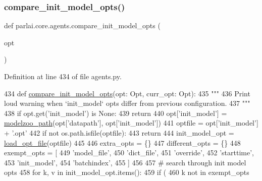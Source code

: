 \subsubsection{\texorpdfstring{compare\+\_\+init\+\_\+model\+\_\+opts()}{compare\_init\_model\_opts()}}
{\footnotesize\ttfamily def parlai.\+core.\+agents.\+compare\+\_\+init\+\_\+model\+\_\+opts (\begin{DoxyParamCaption}\item[{}]{opt }\end{DoxyParamCaption})}



Definition at line 434 of file agents.\+py.


\begin{DoxyCode}
434 \textcolor{keyword}{def }\hyperlink{namespaceparlai_1_1core_1_1agents_a9761bb2314603dd92f5eee786930b21a}{compare\_init\_model\_opts}(opt: Opt, curr\_opt: Opt):
435     \textcolor{stringliteral}{"""}
436 \textcolor{stringliteral}{    Print loud warning when `init\_model` opts differ from previous configuration.}
437 \textcolor{stringliteral}{    """}
438     \textcolor{keywordflow}{if} opt.get(\textcolor{stringliteral}{'init\_model'}) \textcolor{keywordflow}{is} \textcolor{keywordtype}{None}:
439         \textcolor{keywordflow}{return}
440     opt[\textcolor{stringliteral}{'init\_model'}] = \hyperlink{namespaceparlai_1_1agents_1_1legacy__agents_1_1seq2seq_1_1utils__v0_a5fbd3301b67f00d6d146fb01c7cd7626}{modelzoo\_path}(opt[\textcolor{stringliteral}{'datapath'}], opt[\textcolor{stringliteral}{'init\_model'}])
441     optfile = opt[\textcolor{stringliteral}{'init\_model'}] + \textcolor{stringliteral}{'.opt'}
442     \textcolor{keywordflow}{if} \textcolor{keywordflow}{not} os.path.isfile(optfile):
443         \textcolor{keywordflow}{return}
444     init\_model\_opt = \hyperlink{namespaceparlai_1_1core_1_1opt_a37f4d5498e9174737b7dab37a786c04f}{load\_opt\_file}(optfile)
445 
446     extra\_opts = \{\}
447     different\_opts = \{\}
448     exempt\_opts = [
449         \textcolor{stringliteral}{'model\_file'},
450         \textcolor{stringliteral}{'dict\_file'},
451         \textcolor{stringliteral}{'override'},
452         \textcolor{stringliteral}{'starttime'},
453         \textcolor{stringliteral}{'init\_model'},
454         \textcolor{stringliteral}{'batchindex'},
455     ]
456 
457     \textcolor{comment}{# search through init model opts}
458     \textcolor{keywordflow}{for} k, v \textcolor{keywordflow}{in} init\_model\_opt.items():
459         \textcolor{keywordflow}{if} (
460             k \textcolor{keywordflow}{not} \textcolor{keywordflow}{in} exempt\_opts

\end{DoxyCode}
